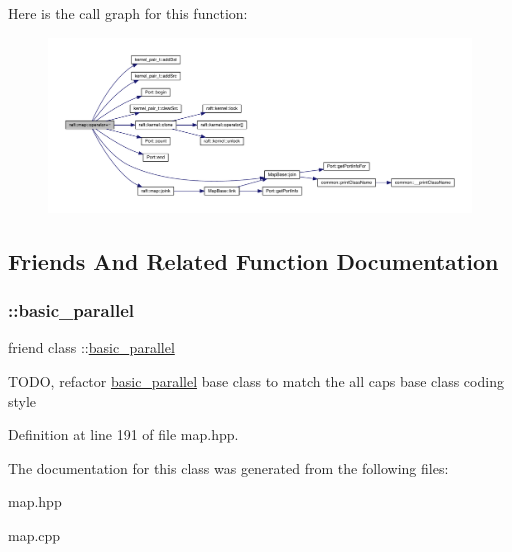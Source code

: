 Here is the call graph for this function\+:
\nopagebreak
\begin{figure}[H]
\begin{center}
\leavevmode
\includegraphics[width=350pt]{classraft_1_1map_ad4bd4cf9bdb1d49e481e572cfdb90476_cgraph}
\end{center}
\end{figure}


\subsection{Friends And Related Function Documentation}
\hypertarget{classraft_1_1map_ae75d52e84ecfc11bcaa43dd9fe149a2f}{}\label{classraft_1_1map_ae75d52e84ecfc11bcaa43dd9fe149a2f} 
\subsubsection{\texorpdfstring{\+::basic\+\_\+parallel}{::basic\_parallel}}
{\footnotesize\ttfamily friend class \+::\hyperlink{classbasic__parallel}{basic\+\_\+parallel}\hspace{0.3cm}{\ttfamily [friend]}}

T\+O\+DO, refactor \hyperlink{classbasic__parallel}{basic\+\_\+parallel} base class to match the all caps base class coding style 

Definition at line 191 of file map.\+hpp.



The documentation for this class was generated from the following files\+:\begin{DoxyCompactItemize}
\item 
map.\+hpp\item 
map.\+cpp\end{DoxyCompactItemize}
